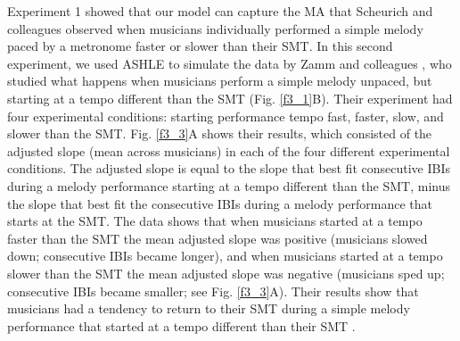 \documentclass{report}
\begin{document}
Experiment 1 showed that our model can capture the MA that Scheurich and colleagues \cite{scheurich2018tapping} observed when musicians individually performed a simple melody paced by a metronome faster or slower than their SMT. In this second experiment, we used ASHLE to simulate the data by Zamm and colleagues \cite{zamm2018musicians}, who studied what happens when musicians perform a simple melody unpaced, but starting at a tempo different than the SMT (Fig.{} \ref{f3_1}B). Their experiment had four experimental conditions: starting performance tempo fast, faster, slow, and slower than the SMT. Fig.{} \ref{f3_3}A shows their results, which consisted of the adjusted slope (mean across musicians) in each of the four different experimental conditions. The adjusted slope is equal to the slope that best fit consecutive IBIs during a melody performance starting at a tempo different than the SMT, minus the slope that best fit the consecutive IBIs during a melody performance that starts at the SMT. The data shows that when musicians started at a tempo faster than the SMT the mean adjusted slope was positive (musicians slowed down; consecutive IBIs became longer), and when musicians started at a tempo slower than the SMT the mean adjusted slope was negative (musicians sped up; consecutive IBIs became smaller; see Fig.{} \ref{f3_3}A). Their results show that musicians had a tendency to return to their SMT during a simple melody performance that started at a tempo different than their SMT \cite{zamm2018musicians}. 
\end{document}
